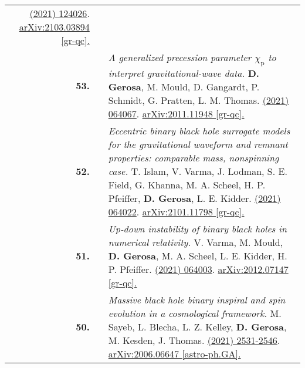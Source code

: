 {\begin{longtable}{rp{0.3cm}p{15.8cm}}
\newline{}
\href{https://journals.aps.org/prd/abstract/10.1103/PhysRevD.103.124026}{\prd 103 (2021) 124026}. \href{https://arxiv.org/abs/2103.03894}{arXiv:2103.03894 [gr-qc].}
\vspace{0.09cm}\\
%
\textbf{53.} & & \textit{A generalized precession parameter $\chi_\mathrm{p}$ to interpret gravitational-wave data.}
\newline{}
\textbf{D. Gerosa}, M. Mould, D. Gangardt, P. Schmidt, G. Pratten, L. M. Thomas.
\newline{}
\href{https://journals.aps.org/prd/abstract/10.1103/PhysRevD.103.064067}{\prd 103 (2021) 064067}. \href{https://arxiv.org/abs/2011.11948}{arXiv:2011.11948 [gr-qc].}
\vspace{0.09cm}\\
%
\textbf{52.} & & \textit{Eccentric binary black hole surrogate models for the gravitational waveform and remnant properties: comparable mass, nonspinning case.}
\newline{}
T. Islam, V. Varma, J. Lodman, S. E. Field, G. Khanna, M. A. Scheel, H. P. Pfeiffer,  \textbf{D. Gerosa}, L. E. Kidder.
\newline{}
\href{https://journals.aps.org/prd/abstract/10.1103/PhysRevD.103.064022}{\prd 103 (2021) 064022}. \href{https://arxiv.org/abs/2101.11798}{arXiv:2101.11798 [gr-qc].}
\vspace{0.09cm}\\
%
\textbf{51.} & & \textit{Up-down instability of binary black holes in numerical relativity.}
\newline{}
V. Varma, M. Mould, \textbf{D. Gerosa}, M. A. Scheel, L. E. Kidder, H. P. Pfeiffer.
\newline{}
\href{https://journals.aps.org/prd/abstract/10.1103/PhysRevD.103.064003}{\prd 103 (2021) 064003}. \href{https://arxiv.org/abs/2012.07147}{arXiv:2012.07147 [gr-qc].}
\vspace{0.09cm}\\
%
\textbf{50.} & & \textit{Massive black hole binary inspiral and spin evolution in a cosmological framework.}
\newline{}
M. Sayeb, L. Blecha, L. Z. Kelley, \textbf{D. Gerosa}, M. Kesden, J. Thomas.
\newline{}
\href{https://doi.org/10.1093/mnras/staa3826}{\mnras 501 (2021) 2531-2546}. \href{https://arxiv.org/abs/2006.06647}{arXiv:2006.06647 [astro-ph.GA].}
\vspace{0.09cm}\\

\end{longtable}}

